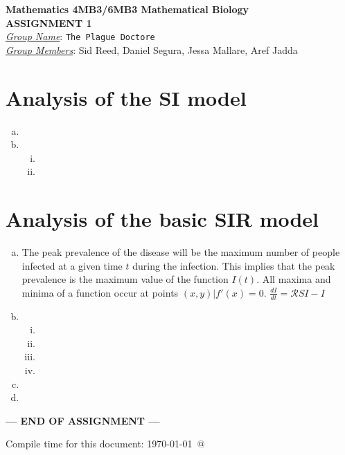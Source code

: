 \documentclass[12pt]{article}
\begin{document}
\begin{center}
{\bfseries Mathematics 4MB3/6MB3 Mathematical Biology\\
 ASSIGNMENT {\color{blue}1}}\\
\medskip
\underline{\emph{Group Name}}: \texttt{{\color{blue}The Plague Doctore}}\\
\medskip
\underline{\emph{Group Members}}: {\color{blue}Sid Reed, Daniel Segura, Jessa Mallare, Aref Jadda}
\end{center}
\section{Analysis of the SI model}
\SIanalIntro
\begin{enumerate}[(a)]
\item
\item
  \begin{enumerate}[(i)]
  \item
  \item
  \end{enumerate}
\end{enumerate}
\section{Analysis of the basic SIR  model}
\basicSIRanalIntro
\begin{enumerate}[(a)]
\item
The peak prevalence of the disease will be the maximum number of people infected at a given time $t$ during the infection.
This implies that the peak prevalence is the maximum value of the function $I(t)$.
All maxima and minima of a function occur at points $(x,y) | f'(x) = 0$.
$\frac{dI}{dt} = {\mathcal R}SI - I$
\item
  \begin{enumerate}[(i)]
      \item
      \item
      \item
      \item
  \end{enumerate}
\item
\item
\end{enumerate}
\centerline{\bf--- END OF ASSIGNMENT ---}
\bigskip
Compile time for this document:
\today\ @ \thistime
\end{document}
